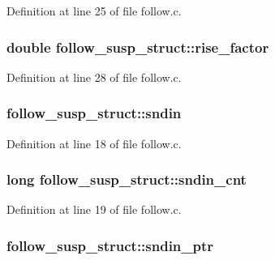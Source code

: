 Definition at line 25 of file follow.\+c.

\subsubsection[{\texorpdfstring{rise\+\_\+factor}{rise_factor}}]{\setlength{\rightskip}{0pt plus 5cm}double follow\+\_\+susp\+\_\+struct\+::rise\+\_\+factor}\hypertarget{structfollow__susp__struct_a2c9f86c190ab2b41aa0fa9c711ebd4a2}{}\label{structfollow__susp__struct_a2c9f86c190ab2b41aa0fa9c711ebd4a2}


Definition at line 28 of file follow.\+c.

\subsubsection[{\texorpdfstring{sndin}{sndin}}]{ follow\+\_\+susp\+\_\+struct\+::sndin}\hypertarget{structfollow__susp__struct_ae56ef75cea96a2a26645b43503b43265}{}\label{structfollow__susp__struct_ae56ef75cea96a2a26645b43503b43265}


Definition at line 18 of file follow.\+c.

\subsubsection[{\texorpdfstring{sndin\+\_\+cnt}{sndin_cnt}}]{\setlength{\rightskip}{0pt plus 5cm}long follow\+\_\+susp\+\_\+struct\+::sndin\+\_\+cnt}\hypertarget{structfollow__susp__struct_a8fc3d5fcfd27c91cee6424092b56d0a5}{}\label{structfollow__susp__struct_a8fc3d5fcfd27c91cee6424092b56d0a5}


Definition at line 19 of file follow.\+c.

\subsubsection[{\texorpdfstring{sndin\+\_\+ptr}{sndin_ptr}}]{ follow\+\_\+susp\+\_\+struct\+::sndin\+\_\+ptr}\hypertarget{structfollow__susp__struct_a57dbccd0134c2f5a1bcd201b476c287a}{}\label{structfollow__susp__struct_a57dbccd0134c2f5a1bcd201b476c287a}


